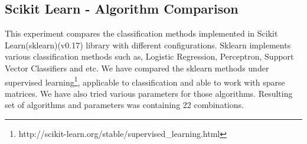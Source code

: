 \documentclass[twoside,11pt]{article}
\begin{document}
\subsection{Scikit Learn - Algorithm Comparison}
This experiment compares the classification methods implemented in Scikit Learn(sklearn)(v0.17) library with different configurations. Sklearn implements various classification methods such as, Logistic Regression, Perceptron, Support Vector Classifiers and etc. We have compared the sklearn methods under supervised learning\footnote{http://scikit-learn.org/stable/supervised\_learning.html}, applicable to classification and able to work with sparse matrices. We have also tried various parameters for those algorithms. Resulting set of algorithms and parameters was containing 22 combinations.

\begin{enumerate}
\scriptsize


\end{enumerate}
\end{document}
